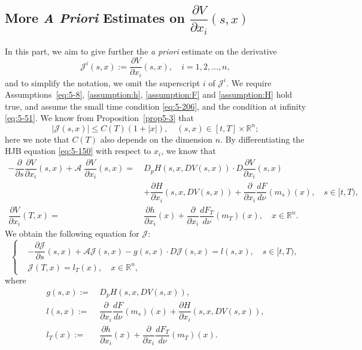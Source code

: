 \documentclass[11pt]{article}
\numberwithin{equation}{section}
\newcommand{\brn}{{\mathbb{R}^n}}
\newcommand{\1}{\mbox{1\hspace{-1mm}I}}
\begin{document}
\subsection{More \textit{A Priori} Estimates on $\dfrac{\partial V}{\partial x_{i}}(s,x)$}\label{subsec:V_x_i}

In this part, we aim to give further the \textit{a priori} estimate on the derivative 
\begin{equation}\label{def:zeta-V_xi}
    \mathcal{J}^i (s,x):=\dfrac{\partial V}{\partial x_{i}}(s,x),\quad i=1,2,\dots,n,
\end{equation}
and to simplify the notation, we omit the superscript $i$ of $\mathcal{J}^i$. We require Assumptions~\ref{eq:5-8}, \ref{assumption:h}, \ref{assumption:F} and \ref{assumption:H} hold true, and assume the small time condition \eqref{eq:5-206}, and the condition at infinity \eqref{eq:5-51}. We know from Proposition~\ref{prop5-3} that
\begin{equation}\label{eq:5-105}
    |\mathcal{J}(s,x)|\le C(T)(1+|x|),\quad (s,x)\in[t,T]\times\brn;
\end{equation}
here we note that $C(T)$ also depends on the dimension $n$. By differentiating the HJB equation \ref{eq:5-150} with respect to $x_{i}$, we know that
\begin{align*}
    -\dfrac{\partial}{\partial s}\dfrac{\partial V}{\partial x_{i}}(s,x)+\mathcal{A}\;\dfrac{\partial V}{\partial x_{i}}(s,x)=\ & D_{p}H(s,x,DV(s,x))\cdot D\dfrac{\partial V}{\partial x_{i}}(s,x)\\
    &+\dfrac{\partial H}{\partial x_{i}}(s,x,DV(s,x))+\dfrac{\partial}{\partial x_{i}}\dfrac{dF}{d\nu}\left(m_s\right)(x),\quad s\in[t,T),\\
    \dfrac{\partial V}{\partial x_{i}}(T,x)=\ & \dfrac{\partial h}{\partial x_{i}}(x)+\dfrac{\partial}{\partial x_{i}}\dfrac{d F_{T}}{d\nu}\left(m_T\right)(x),\quad x\in\brn.
\end{align*}
We obtain the following equation for $\mathcal{J}$:
\begin{equation}\label{eq:5-101}
    \left\{
    \begin{aligned}
        &-\dfrac{\partial\mathcal{J}}{\partial s}(s,x)+\mathcal{A}\mathcal{J}(s,x)-g(s,x)\cdot D\mathcal{J}(s,x)=l(s,x),\quad s\in[t,T),\\
        &\mathcal{J}(T,x)=l_{T}(x),\quad x\in\brn,
    \end{aligned}
    \right.
\end{equation}
where
\begin{equation}\label{define_g}
    \begin{aligned}
        g(s,x):=\ & D_{p}H(s,x,DV(s,x)),\\
        l(s,x):=\ & \dfrac{\partial}{\partial x_{i}}\dfrac{dF}{d\nu}(m_s)(x)+\dfrac{\partial H}{\partial x_{i}}(s,x,DV(s,x)),\\
        l_{T}(x):=\ & \dfrac{\partial h}{\partial x_{i}}(x)+\dfrac{\partial}{\partial x_{i}}\dfrac{d F_{T}}{d\nu}\left(m_T\right)(x).
    \end{aligned}
\end{equation}
\end{document}
